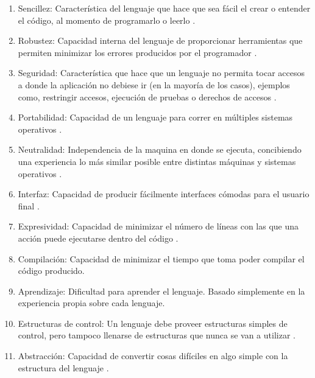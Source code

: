 \documentclass[a4paper,12pt,openany,oneside]{book}
\begin{document}
\begin{enumerate}

\item Sencillez: Característica del lenguaje que hace que sea fácil el crear o entender el código, al momento de programarlo o leerlo \cite{data4}.

\item Robustez: Capacidad interna del lenguaje de proporcionar herramientas que permiten minimizar los errores producidos por el programador \cite{data4}.

\item Seguridad: Característica que hace que un lenguaje no permita tocar accesos a donde la aplicación no debiese ir (en la mayoría de los casos), ejemplos como, restringir accesos, ejecución de pruebas o derechos de accesos \cite{data4}.

\item Portabilidad: Capacidad de un lenguaje para correr en múltiples sistemas operativos \cite{data4}.

\item Neutralidad: Independencia de la maquina en donde se ejecuta, concibiendo una experiencia lo más similar posible entre distintas máquinas y sistemas operativos \cite{data4}.

\item Interfaz: Capacidad de producir fácilmente interfaces cómodas para el usuario final \cite{data4}.

\item Expresividad: Capacidad de minimizar el número de líneas con las que una acción puede ejecutarse dentro del código \cite{data5}.

\item Compilación: Capacidad de minimizar el tiempo que toma poder compilar el código producido.

\item Aprendizaje: Dificultad para aprender el lenguaje. Basado simplemente en la experiencia propia sobre cada lenguaje.

\item Estructuras de control: Un lenguaje debe proveer estructuras simples de control, pero tampoco llenarse de estructuras que nunca se van a utilizar \cite{data6}.

\item Abstracción: Capacidad de convertir cosas difíciles en algo simple con la estructura del lenguaje \cite{data6}.

\end{enumerate}
\end{document}
